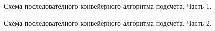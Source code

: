 \documentclass[12pt]{report}
\begin{document}
\begin{figure}[h]
	\caption{Схема последователного конвейерного алгоритма подсчета. Часть 1.}
	\label{figure:image}
\end{figure}

\begin{figure}[h!]
	\caption{Схема последователного конвейерного алгоритма подсчета. Часть 2.}
	\label{figure:image}
\end{figure}
\end{document}
